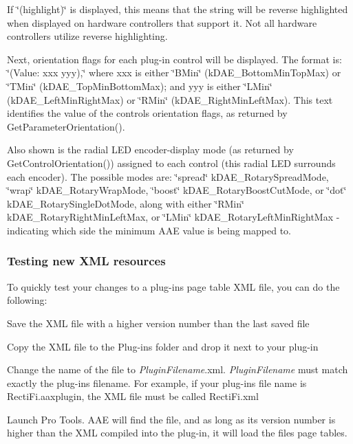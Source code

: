\begin{DoxyItemize}
\begin{DoxyItemize}
\item If \char`\"{}(highlight)\char`\"{} is displayed, this means that the string will be reverse highlighted when displayed on hardware controllers that support it. Not all hardware controllers utilize reverse highlighting. 
\item Next, orientation flags for each plug-\/in control will be displayed. The format is\+: \char`\"{}(\+Value\+: xxx yyy),\char`\"{} where xxx is either \char`\"{}\+B\+Min\char`\"{} (k\+D\+A\+E\+\_\+\+Bottom\+Min\+Top\+Max) or \char`\"{}\+T\+Min\char`\"{} (k\+D\+A\+E\+\_\+\+Top\+Min\+Bottom\+Max); and yyy is either \char`\"{}\+L\+Min\char`\"{} (k\+D\+A\+E\+\_\+\+Left\+Min\+Right\+Max) or \char`\"{}\+R\+Min\char`\"{} (k\+D\+A\+E\+\_\+\+Right\+Min\+Left\+Max). This text identifies the value of the control\textquotesingle{}s orientation flags, as returned by Get\+Parameter\+Orientation(). 
\item Also shown is the radial L\+E\+D encoder-\/display mode (as returned by Get\+Control\+Orientation()) assigned to each control (this radial L\+E\+D surrounds each encoder). The possible modes are\+: \char`\"{}spread\char`\"{} k\+D\+A\+E\+\_\+\+Rotary\+Spread\+Mode, \char`\"{}wrap\char`\"{} k\+D\+A\+E\+\_\+\+Rotary\+Wrap\+Mode, \char`\"{}boost\char`\"{} k\+D\+A\+E\+\_\+\+Rotary\+Boost\+Cut\+Mode, or \char`\"{}dot\char`\"{} k\+D\+A\+E\+\_\+\+Rotary\+Single\+Dot\+Mode, along with either \char`\"{}\+R\+Min\char`\"{} k\+D\+A\+E\+\_\+\+Rotary\+Right\+Min\+Left\+Max, or \char`\"{}\+L\+Min\char`\"{} k\+D\+A\+E\+\_\+\+Rotary\+Left\+Min\+Right\+Max -\/ indicating which side the minimum A\+A\+E value is being mapped to.  
\end{DoxyItemize}
\end{DoxyItemize}

\hypertarget{a00363_subsection_testing_xml_resources}{}\subsubsection{Testing new X\+M\+L resources}\label{a00363_subsection_testing_xml_resources}
To quickly test your changes to a plug-\/in\textquotesingle{}s page table X\+M\+L file, you can do the following\+: 
\begin{DoxyItemize}
\item Save the X\+M\+L file with a higher version number than the last saved file  
\item Copy the X\+M\+L file to the Plug-\/ins folder and drop it next to your plug-\/in  
\item Change the name of the file to {\itshape Plugin\+Filename}.xml. {\itshape Plugin\+Filename} must match exactly the plug-\/ins filename. For example, if your plug-\/in\textquotesingle{}s file name is Recti\+Fi.\+aaxplugin, the X\+M\+L file must be called Recti\+Fi.\+xml  
\item Launch Pro Tools. A\+A\+E will find the file, and as long as its version number is higher than the X\+M\+L compiled into the plug-\/in, it will load the file\textquotesingle{}s page tables.  
\end{DoxyItemize}


